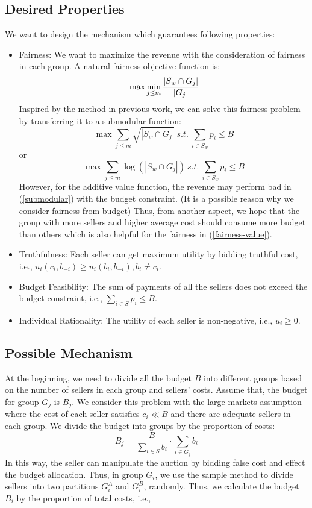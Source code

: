 \documentclass{article}
\begin{document}
\subsection{Desired Properties}
We want to design the mechanism which guarantees following properties:
\begin{itemize}
    \item Fairness: We want to maximize the revenue with the consideration of fairness in each group.  A natural fairness objective function is: 
    \begin{equation}{\label{fairness-value}}
        \max\min_{j\le m} \frac{|S_w\cap G_j|}{|G_j|}
    \end{equation}
    Inspired by the method in previous work, we can solve this fairness problem by transferring it to a submodular function:
    \begin{equation}\label{submodular}
        \max \sum_{j\le m}   \sqrt{{|S_w\cap G_j|}}\ s.t. \ \sum_{i\in S_w}p_i\le B
    \end{equation}
    or 
    \begin{equation}
        \max \sum_{j\le m}   \log({{|S_w\cap G_j|}})\ s.t. \ \sum_{i\in S_w}p_i\le B
    \end{equation}
    However, for the additive value function, the revenue may perform bad in (\ref{submodular}) with the budget constraint. (It is a possible reason why we consider fairness from budget) Thus, from another aspect, we hope that the group with more sellers and higher average cost should consume more budget than others which is also helpful for the fairness in (\ref{fairness-value}).
    \item Truthfulness: Each seller can get maximum utility by bidding truthful cost, i.e., $u_i(c_i,b_{-i})\ge u_i(b_i,b_{-i}),b_i\neq c_i$.
    \item Budget Feasibility: The sum of payments of all the sellers does not exceed the budget constraint, i.e., $\sum_{i\in S}p_i\le B$.
    \item Individual Rationality: The utility of each seller is non-negative, i.e., $u_i\ge 0$.
\end{itemize}

\subsection{Possible Mechanism}
At the beginning, we need to divide all the budget $B$ into different groups based on the number of sellers in each group and sellers' costs. Assume that,  the budget for group $G_j$ is $B_j$. We consider this problem with the large markets assumption where the cost of each seller satisfies $c_i\ll B$ and there are adequate sellers in each group. We divide the budget into groups by the proportion of costs:
\begin{equation}
    B_j=\frac{B}{\sum_{i\in S}b_i}\cdot \sum_{i\in G_j}b_i
\end{equation}
In this way, the seller can manipulate the auction by bidding false cost and effect the budget allocation. Thus, in group $G_i$, we use the sample method to divide sellers into two partitions $G_i^A$ and $G_i^B$, randomly. Thus, we calculate the budget $B_i$ by the proportion of total costs, i.e.,
\end{document}
